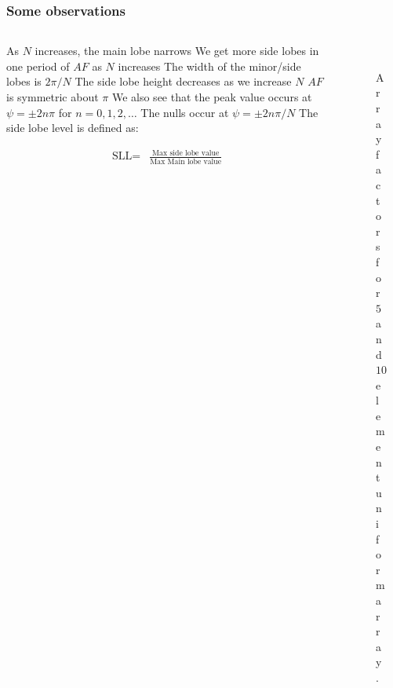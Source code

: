 \documentclass[10pt]{beamer}
\begin{document}
\begin{frame}
    \frametitle{Some observations}

    \begin{columns}[T] %
        \begin{column}{.6\textwidth}
            \begin{outline}
                \small
                \1 As $N $ increases, the main lobe narrows
                \1 We get more side lobes in one period of $AF$ as $N$ increases
                \1 The width of the minor/side lobes is $2\pi/N$
                \1 The side lobe height decreases as we increase $N$
                \1 $AF $ is symmetric about $\pi$ 
                \1 We also see that the peak value occurs at $\psi =\pm 2 n \pi$ for $n = 0,1,2, \dots$
                \1 The nulls occur at $\psi =\pm 2 n \pi/N$
                \1 The side lobe level is defined as:
            \end{outline}
\begin{align*}
    \text{SLL} {}=& \frac{\text{Max side lobe value}}{\text{Max Main lobe value}}
\end{align*}
        \end{column}
        \begin{column}{.5\textwidth}
            \begin{figure}[T!]
                \centering
                \\
                \caption{Array factors for $5$ and $10$ element uniform array.}
                \label{fig:E_z fields}
              \end{figure}
        \end{column}%
    \end{columns}
    \normalsize
\end{frame}
\end{document}
